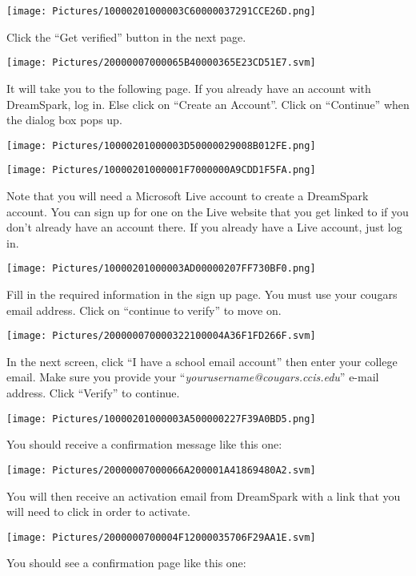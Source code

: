 \documentclass[
]{article}
\begin{document}
\texttt{[image: Pictures/10000201000003C60000037291CCE26D.png]}

Click the ``Get verified'' button in the next page.

\texttt{[image: Pictures/20000007000065B40000365E23CD51E7.svm]}

It will take you to the following page. If you already have an account
with DreamSpark, log in. Else click on ``Create an Account''. Click on
``Continue'' when the dialog box pops up.

\texttt{[image: Pictures/10000201000003D50000029008B012FE.png]}

\texttt{[image: Pictures/10000201000001F7000000A9CDD1F5FA.png]}

Note that you will need a Microsoft Live account to create a DreamSpark
account. You can sign up for one on the Live website that you get linked
to if you don't already have an account there. If you already have a
Live account, just log in.

\texttt{[image: Pictures/10000201000003AD00000207FF730BF0.png]}

Fill in the required information in the sign up page. You must use your
cougars email address. Click on ``continue to verify'' to move on.

\texttt{[image: Pictures/200000070000322100004A36F1FD266F.svm]}

In the next screen, click ``I have a school email account'' then enter
your college email. Make sure you provide your
``\emph{yourusername@cougars.ccis.edu}'' e-mail address. Click
``Verify'' to continue.

\texttt{[image: Pictures/10000201000003A500000227F39A0BD5.png]}

\hfill\break
You should receive a confirmation message like this one:

\texttt{[image: Pictures/20000007000066A200001A41869480A2.svm]}

You will then receive an activation email from DreamSpark with a link
that you will need to click in order to activate.

\texttt{[image: Pictures/2000000700004F12000035706F29AA1E.svm]}

You should see a confirmation page like this one:
\end{document}
